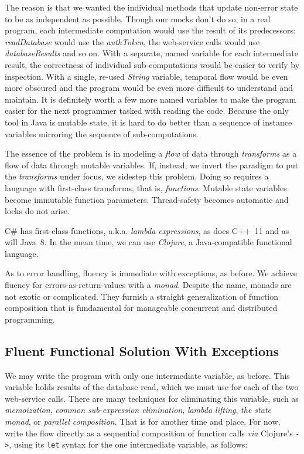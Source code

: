 \documentclass[11pt]{article}
\begin{document}
The reason is that we wanted the individual methods that update
non-error state to be as independent as possible. Though our mocks
don't do so, in a real program, each intermediate computation would
use the result of its predecessors: \emph{readDatabase} would use the
\emph{authToken}, the web-service calls would use \emph{databaseResults} and
so on. With a separate, named variable for each intermediate result,
the correctness of individual sub-computations would be easier to
verify by inspection. With a single, re-used \emph{String} variable,
temporal flow would be even more obscured and the program would be
even more difficult to understand and maintain. It is definitely
worth a few more named variables to make the program easier for the
next programmer tasked with reading the code. Because the only tool
in Java is mutable state, it is hard to do better than a sequence of
instance variables mirroring the sequence of sub-computations.

The essence of the problem is in modeling a \emph{flow} of data through
\emph{transforms} as a flow of data through mutable variables. If,
instead, we invert the paradigm to put the \emph{transforms} under focus,
we sidestep this problem. Doing so requires a language with
first-class transforms, that is, \emph{functions}. Mutable state
variables become immutable function parameters. Thread-safety
becomes automatic and locks do not arise.

\mbox{C\#} has first-class functions, a.k.a. \emph{lambda expressions},
as does \mbox{C++ 11} and as will \mbox{Java 8}. In the mean time,
we can use \emph{Clojure}, a Java-compatible functional language.

As to error handling, fluency is immediate with exceptions, as
before. We achieve fluency for errors-as-return-values with a
\emph{monad}. Despite the name, monads are not exotic or complicated.
They furnish a straight generalization of function composition that
is fundamental for manageable concurrent and distributed
programming.

\subsection{Fluent Functional Solution With Exceptions}
\label{sec-3-1}

We may write the program with only one intermediate variable, as
before. This variable holds results of the database read, which we
must use for each of the two web-service calls. There are many
techniques for eliminating this variable, such as \emph{memoization},
\emph{common sub-expression elimination}, \emph{lambda lifting}, \emph{the state
monad}, or \emph{parallel composition}. That is for another time and
place. For now, write the flow directly as a sequential composition
of function calls \emph{via} Clojure's \verb|->|, using its \verb|let|
syntax for the one intermediate variable, as follows:
\end{document}
